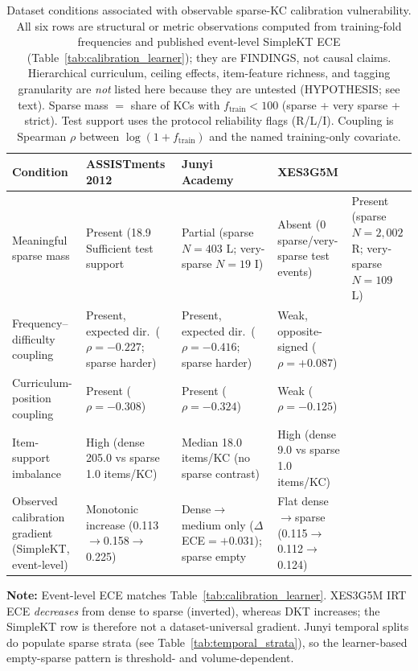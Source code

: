 \begin{table}[htbp]
\caption{Dataset conditions associated with observable sparse-KC calibration vulnerability. All six rows are structural or metric observations computed from training-fold frequencies and published event-level SimpleKT ECE (Table~\ref{tab:calibration_learner}); they are FINDINGS, not causal claims. Hierarchical curriculum, ceiling effects, item-feature richness, and tagging granularity are \emph{not} listed here because they are untested (HYPOTHESIS; see text). Sparse mass $= $ share of KCs with $f_{\mathrm{train}}<100$ (sparse + very sparse + strict). Test support uses the protocol reliability flags (R/L/I). Coupling is Spearman $\rho$ between $\log(1+f_{\mathrm{train}})$ and the named training-only covariate.}
\label{tab:a5_dataset_conditions}
\centering
\footnotesize
\setlength{\tabcolsep}{3.5pt}
\begin{tabularx}{\textwidth}{>{\raggedright\arraybackslash}p{3.3cm}XXX}
\toprule
\textbf{Condition} & \textbf{ASSISTments 2012} & \textbf{Junyi Academy} & \textbf{XES3G5M} \\
\midrule
Meaningful sparse mass & Present (18.9%
\midrule
Sufficient test support & Partial (sparse $N=403$ L; very-sparse $N=19$ I) & Absent (0 sparse/very-sparse test events) & Present (sparse $N=2,002$ R; very-sparse $N=109$ L) \\
\midrule
Frequency--difficulty coupling & Present, expected dir.\ ($\rho=-0.227$; sparse harder) & Present, expected dir.\ ($\rho=-0.416$; sparse harder) & Weak, opposite-signed ($\rho=+0.087$) \\
\midrule
Curriculum-position coupling & Present ($\rho=-0.308$) & Present ($\rho=-0.324$) & Weak ($\rho=-0.125$) \\
\midrule
Item-support imbalance & High (dense 205.0 vs sparse 1.0 items/KC) & Median 18.0 items/KC (no sparse contrast) & High (dense 9.0 vs sparse 1.0 items/KC) \\
\midrule
Observed calibration gradient (SimpleKT, event-level) & Monotonic increase (0.113$\to$0.158$\to$0.225) & Dense$\to$medium only ($\Delta$ECE$=+0.031$); sparse empty & Flat dense$\to$sparse (0.115$\to$0.112$\to$0.124) \\
\bottomrule
\end{tabularx}

\vspace{1ex}
{\scriptsize \textbf{Note:} Event-level ECE matches Table~\ref{tab:calibration_learner}. XES3G5M IRT ECE \emph{decreases} from dense to sparse (inverted), whereas DKT increases; the SimpleKT row is therefore not a dataset-universal gradient. Junyi temporal splits do populate sparse strata (see Table~\ref{tab:temporal_strata}), so the learner-based empty-sparse pattern is threshold- and volume-dependent.\par}
\end{table}
